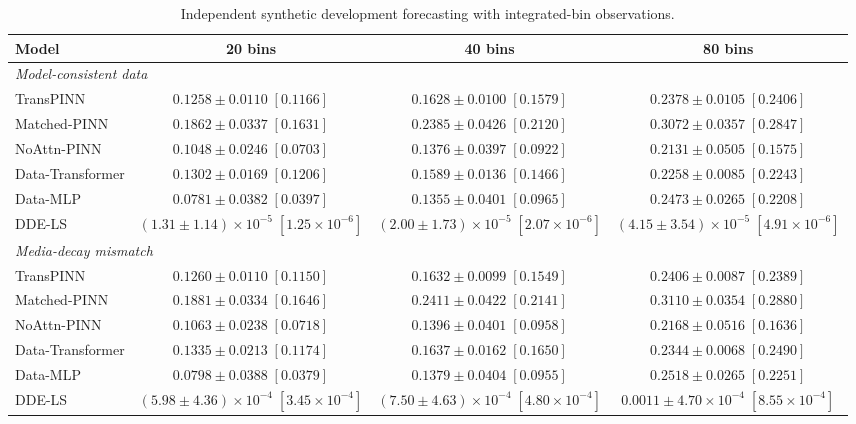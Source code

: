 \begin{table}[t]
\centering
\caption{Independent synthetic development forecasting with integrated-bin observations.}
\label{tab:synthetic_development}
\footnotesize
\setlength{\tabcolsep}{4pt}
\renewcommand{\arraystretch}{1.08}
\begin{tabular*}{\textwidth}{@{\extracolsep{\fill}}lccc@{}}
\toprule
Model & 20 bins & 40 bins & 80 bins \\
\midrule
\multicolumn{4}{l}{\textit{Model-consistent data}} \\
TransPINN & $0.1258\pm0.0110\;[0.1166]$ & $0.1628\pm0.0100\;[0.1579]$ & $0.2378\pm0.0105\;[0.2406]$ \\
Matched-PINN & $0.1862\pm0.0337\;[0.1631]$ & $0.2385\pm0.0426\;[0.2120]$ & $0.3072\pm0.0357\;[0.2847]$ \\
NoAttn-PINN & $0.1048\pm0.0246\;[0.0703]$ & $0.1376\pm0.0397\;[0.0922]$ & $0.2131\pm0.0505\;[0.1575]$ \\
Data-Transformer & $0.1302\pm0.0169\;[0.1206]$ & $0.1589\pm0.0136\;[0.1466]$ & $0.2258\pm0.0085\;[0.2243]$ \\
Data-MLP & $0.0781\pm0.0382\;[0.0397]$ & $0.1355\pm0.0401\;[0.0965]$ & $0.2473\pm0.0265\;[0.2208]$ \\
DDE-LS & $(1.31\pm1.14)\times10^{-5}\;[1.25\times10^{-6}]$ & $(2.00\pm1.73)\times10^{-5}\;[2.07\times10^{-6}]$ & $(4.15\pm3.54)\times10^{-5}\;[4.91\times10^{-6}]$ \\
\midrule
\multicolumn{4}{l}{\textit{Media-decay mismatch}} \\
TransPINN & $0.1260\pm0.0110\;[0.1150]$ & $0.1632\pm0.0099\;[0.1549]$ & $0.2406\pm0.0087\;[0.2389]$ \\
Matched-PINN & $0.1881\pm0.0334\;[0.1646]$ & $0.2411\pm0.0422\;[0.2141]$ & $0.3110\pm0.0354\;[0.2880]$ \\
NoAttn-PINN & $0.1063\pm0.0238\;[0.0718]$ & $0.1396\pm0.0401\;[0.0958]$ & $0.2168\pm0.0516\;[0.1636]$ \\
Data-Transformer & $0.1335\pm0.0213\;[0.1174]$ & $0.1637\pm0.0162\;[0.1650]$ & $0.2344\pm0.0068\;[0.2490]$ \\
Data-MLP & $0.0798\pm0.0388\;[0.0379]$ & $0.1379\pm0.0404\;[0.0955]$ & $0.2518\pm0.0265\;[0.2251]$ \\
DDE-LS & $(5.98\pm4.36)\times10^{-4}\;[3.45\times10^{-4}]$ & $(7.50\pm4.63)\times10^{-4}\;[4.80\times10^{-4}]$ & $0.0011\pm4.70\times10^{-4}\;[8.55\times10^{-4}]$ \\

\end{tabular*}
\end{table}
